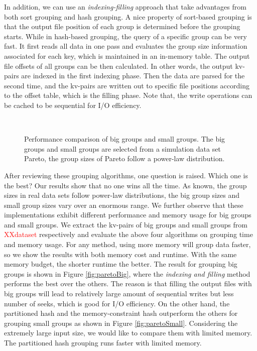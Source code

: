 In addition, we can use an \emph{indexing-filling} approach that take advantages from both sort grouping and hash grouping. A nice property of sort-based grouping is that the output file position of each group is determined before the grouping starts. While in hash-based grouping, the query of a specific group can be very fast. It first reads all data in one pass and evaluates the group size information associated for each key, which is maintained in an in-memory table. The output file offsets of all groups can be then calculated. In other words, the output kv-pairs are indexed in the first indexing phase. Then the data are parsed for the second time, and the kv-pairs are written out to specific file positions according to the offset table, which is the filling phase. Note that, the write operations can be cached to be sequential for I/O efficiency.

\begin{figure}[t]%
    \hspace{0.23cm}
    \\
\caption{Performance comparison of big groups and small groups. The big groups and small groups are selected from a simulation data set Pareto, the group sizes of Pareto follow a power-law distribution.}
\label{fig: big and small}
\end{figure}

After reviewing these grouping algorithms, one question is raised. Which one is the best? Our results show that no one wins all the time. As known, the group sizes in real data sets follow power-law distributions, the big group sizes and small group sizes vary over an enormous range. We further observe that these implementations exhibit different performance and memory usage for big groups and small groups. We extract the kv-pairs of big groups and small groups from \textcolor{red}{XXdataset} respectively and evaluate the above four algorithms on grouping time and memory usage. For any method, using more memory will group data faster, so we show the results with both memory cost and runtime. With the same memory budget, the shorter runtime the better. The result for grouping big groups is shown in Figure \ref{fig:paretoBig}, where the \emph{indexing and filling} method performs the best over the others. The reason is that filling the output files with big groups will lead to relatively large amount of sequential writes but less number of seeks, which is good for I/O efficiency. On the other hand, the partitioned hash and the memory-constraint hash outperform the others for grouping small groups as shown in Figure \ref{fig:paretoSmall}. Considering the extremely large input size, we would like to compare them with limited memory. The partitioned hash grouping runs faster with limited memory.


